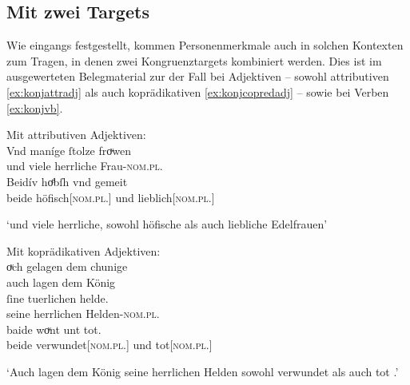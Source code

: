 \subsection{Mit zwei Targets}
\label{subsec:beidkoordtarg}

Wie eingangs festgestellt, kommen Personenmerkmale auch in solchen Kontexten
zum Tragen, in denen zwei Kongruenztargets kombiniert werden. Dies ist im
ausgewerteten Belegmaterial zur \KC{} der Fall bei Adjektiven --
sowohl attributiven \cref{ex:konjattradj} als auch koprädikativen
\cref{ex:konjcopredadj} -- sowie bei Verben \cref{ex:konjvb}.

\begin{exe}
\ex \begin{xlist}
	\ex \label{ex:konjattradj}
		Mit attributiven Adjektiven:\\
		\gll Vnd maníge ſtolze froͮwen \\
			und viele herrliche Frau-\textsc{nom.pl.\FemF} \\
	\sn \gll Beidív hoͤbſh vnd gemeit \\
			beide höfisch[\textsc{nom.pl.\FemF}] und lieblich[\textsc{nom.pl.\FemF}] \\
		\begin{taggedline}{\parencites[\pno~21va,21--22]{kc:VB}[zu][4351--4352]{schroeder1895}}
			\trans `und viele herrliche, sowohl höfische als auch liebliche Edelfrauen'
		\end{taggedline}

	\ex \label{ex:konjcopredadj}
		Mit koprädikativen Adjektiven:\\
		\gll oͮch gelagen dem chunige \\
			auch lagen dem König \\
	\sn \gll ſine tuerlichen helde. \\
			seine herrlichen Helden-\textsc{nom.pl.\MascM} \\
	\sn \gll baide woͮnt unt tot. \\
			beide verwundet[\textsc{nom.pl.\MascM}] und tot[\textsc{nom.pl.\MascM}] \\
		\begin{taggedline}{\parencites[\pno~67vb,34--36]{kc:A1}[vgl.][15880--15883]{schroeder1895}}
			\trans `Auch lagen dem König seine herrlichen Helden sowohl verwundet als auch tot .'
		\end{taggedline}


\end{xlist}
\end{exe}
